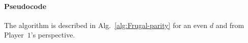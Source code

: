 \documentclass{theoretics}
\newcommand{\Call}[2]{\ProcNameSty{#1}(#2)} %
\newcommand{\PO}{Player~$1$\xspace}
\newcommand{\G}{{\mathcal G}}
\newcommand{\R}{{\mathcal R}}
\renewcommand{\S}{{\mathcal S}}
\newcommand{\fr}{\texttt{fr}}
\newcommand{\notFd}{V \setminus F_d}
\newcommand{\thresh}{\texttt{Th}\xspace}
\newcommand{\zug}[1]{\langle #1  \rangle}
\renewcommand{\set}[1]{\{ #1  \}}
\begin{document}
\paragraph*{Pseudocode}

The algorithm is described in Alg.~\ref{alg:Frugal-parity} for an even $d$ and from \PO's perspective.



\end{document}
